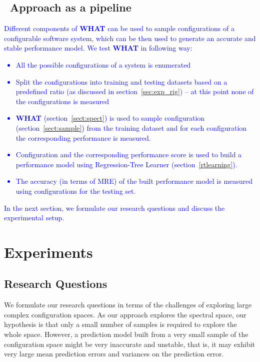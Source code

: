 \documentclass[smallextended]{svjour3}       %
\newcommand{\respto}[1]{
    \fcolorbox{black}{black!15}{
    \label{response:#1}
    \textbf{R-{#1}}}
}
\newcommand{\what}{{\bf WHAT}\xspace}
\begin{document}
\subsection{\respto{1c}~Approach as a pipeline}
\textcolor{blue}{
Different components of \what{} can be used to sample configurations of a configurable software system, which can be then used to generate an accurate and stable performance model. We test \what{} in following way:
\begin{itemize}
    \item All the possible configurations of a system is enumerated
    \item Split the configurations into training and testing datasets based on a predefined ratio (as discussed in section~\ref{sec:exp_rig}) -- at this point none of the configurations is measured
    \item \what{} (section~\ref{sect:spect}) is used to sample configuration (section~\ref{sect:sample}) from the  training dataset and for each configuration the corresponding performance is measured.
    \item Configuration and the corresponding performance score is used to build a performance model using Regression-Tree Learner (section~\ref{rtlearning}).
    \item The accuracy (in terms of MRE) of the built performance model is measured using configurations for the testing set.
\end{itemize}
In the next section, we formulate our research questions and discuss the experimental setup.
}

\section{Experiments}
\label{sec:experiments}



\subsection{Research Questions} 

We formulate our research questions in terms of the challenges of
exploring large complex configuration spaces.
As our approach explores the spectral space, our hypothesis is that only a small
number of samples is required to explore the whole space.
However, a prediction model built from a very small sample of the configuration space might
be very inaccurate and unstable, that is, it may exhibit very large mean prediction errors and variances on the prediction error.
\end{document}
